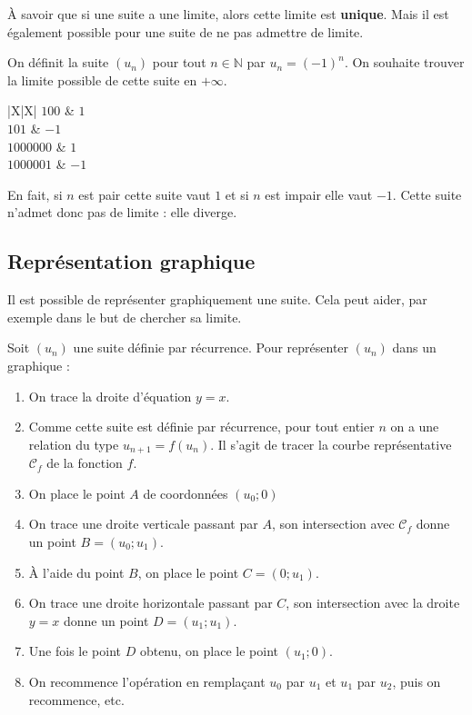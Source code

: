 	À savoir que si une suite a une limite, alors cette limite est \textbf{unique}. Mais il est également possible pour une suite de ne pas admettre de limite.
	
	\begin{tip}[Exemple]
		On définit la suite $(u_n)$ pour tout $n \in \mathbb{N}$ par $u_n = (-1)^n$. On souhaite trouver la limite possible de cette suite en $+ \infty$.
		\newpar
		\begin{whitetabularx}{|X|X|}
			\hline
			$100$ & $1$ \\
			\hline
			$101$ & $-1$ \\
			\hline
			$1 000 000$ & $1$ \\
			\hline
			$1 000 001$ & $-1$ \\
			\hline
		\end{whitetabularx}
		\newpar
		En fait, si $n$ est pair cette suite vaut $1$ et si $n$ est impair elle vaut $-1$. Cette suite n'admet donc pas de limite : elle diverge.
	\end{tip}
	
	\subsection{Représentation graphique}
	
	Il est possible de représenter graphiquement une suite. Cela peut aider, par exemple dans le but de chercher sa limite.
	
	\begin{formula}
		Soit $(u_n)$ une suite définie par récurrence. Pour représenter $(u_n)$ dans un graphique :
		\begin{enumerate}
			\item On trace la droite d'équation $y = x$.
			\item  Comme cette suite est définie par récurrence, pour tout entier $n$ on a une relation du type $u_{n+1} = f(u_n)$. Il s'agit de tracer la courbe représentative $\mathcal{C}_f$ de la fonction $f$.
			\item On place le point $A$ de coordonnées $(u_0; 0)$
			\item On trace une droite verticale passant par $A$, son intersection avec $\mathcal{C}_f$ donne un point $B = (u_0; u_1)$.
			\item À l'aide du point $B$, on place le point $C = (0; u_1)$.
			\item On trace une droite horizontale passant par $C$, son intersection avec la droite $y = x$ donne un point $D = (u_1; u_1)$.
			\item Une fois le point $D$ obtenu, on place le point $(u_1; 0)$.
			\item On recommence l'opération en remplaçant $u_0$ par $u_1$ et $u_1$ par $u_2$, puis on recommence, etc.
		\end{enumerate}
	\end{formula}
	
